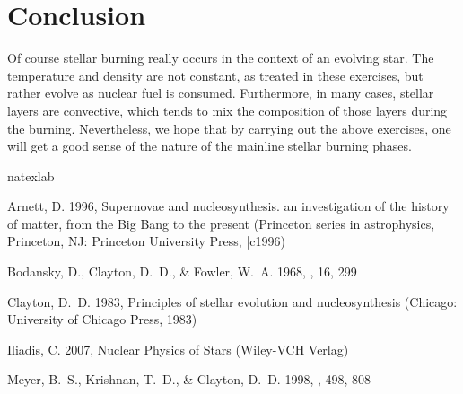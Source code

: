 \documentclass[manuscript]{aastex62}
\begin{document}
\section{Conclusion}

Of course stellar burning really occurs in the context of an evolving star.
The temperature and density are not constant, as treated in these exercises,
but rather evolve as nuclear fuel is consumed.  Furthermore, in many cases,
stellar layers are convective, which tends to mix the composition of those
layers during the burning.  
Nevertheless, we hope that by
carrying out the above exercises, one will get a good sense of the
nature of the mainline stellar burning phases.

\begin{thebibliography}{5}
\expandafter\ifx\csname natexlab\endcsname\relax\def\natexlab#1{#1}\fi

{Arnett}, D. 1996, {Supernovae and nucleosynthesis. an investigation of the
  history of matter, from the Big Bang to the present} (Princeton series in
  astrophysics, Princeton, NJ: Princeton University Press, |c1996)

{Bodansky}, D., {Clayton}, D.~D., \& {Fowler}, W.~A. 1968, \apjs, 16, 299

{Clayton}, D.~D. 1983, {Principles of stellar evolution and nucleosynthesis}
  (Chicago: University of Chicago Press, 1983)

{Iliadis}, C. 2007, {Nuclear Physics of Stars} (Wiley-VCH Verlag)

{Meyer}, B.~S., {Krishnan}, T.~D., \& {Clayton}, D.~D. 1998, \apj, 498, 808

\end{thebibliography}
\end{document}
